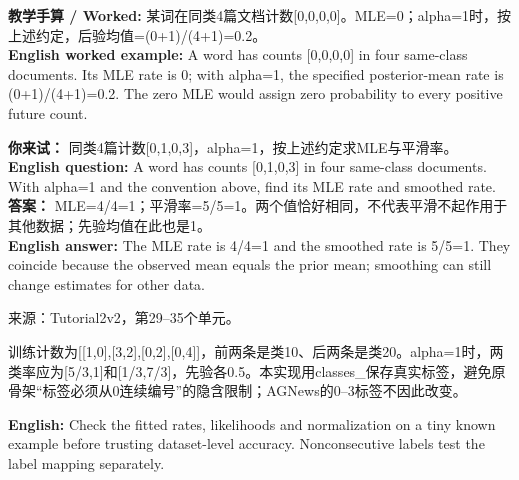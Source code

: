 \textbf{教学手算 / Worked:} 某词在同类4篇文档计数[0,0,0,0]。MLE=0；alpha=1时，按上述约定，后验均值=(0+1)/(4+1)=0.2。\\

\textbf{English worked example:} A word has counts [0,0,0,0] in four same-class documents. Its MLE rate is 0; with alpha=1, the specified posterior-mean rate is (0+1)/(4+1)=0.2. The zero MLE would assign zero probability to every positive future count.


\textbf{你来试：} 同类4篇计数[0,1,0,3]，alpha=1，按上述约定求MLE与平滑率。\\

\textbf{English question:} A word has counts [0,1,0,3] in four same-class documents. With alpha=1 and the convention above, find its MLE rate and smoothed rate.\\

\textbf{答案：} MLE=4/4=1；平滑率=5/5=1。两个值恰好相同，不代表平滑不起作用于其他数据；先验均值在此也是1。\\

\textbf{English answer:} The MLE rate is 4/4=1 and the smoothed rate is 5/5=1. They coincide because the observed mean equals the prior mean; smoothing can still change estimates for other data.


来源：Tutorial2v2，第29–35个单元。











训练计数为[[1,0],[3,2],[0,2],[0,4]]，前两条是类10、后两条是类20。alpha=1时，两类率应为[5/3,1]和[1/3,7/3]，先验各0.5。本实现用classes\_保存真实标签，避免原骨架“标签必须从0连续编号”的隐含限制；AGNews的0–3标签不因此改变。


\textbf{English:} Check the fitted rates, likelihoods and normalization on a tiny known example before trusting dataset-level accuracy. Nonconsecutive labels test the label mapping separately.









